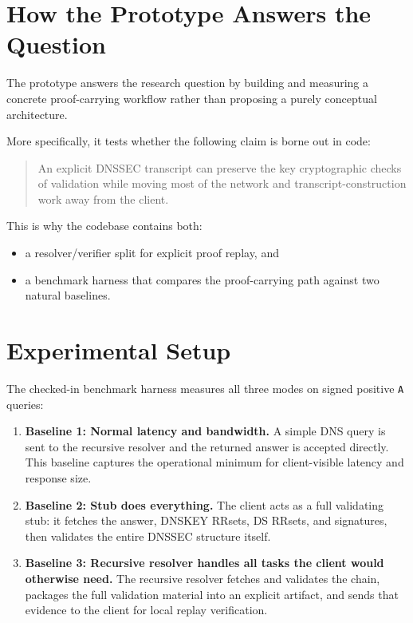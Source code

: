 \documentclass[11pt]{article}
\begin{document}
\section{How the Prototype Answers the Question}

The prototype answers the research question by building and measuring a concrete proof-carrying workflow rather than proposing a purely conceptual architecture.

More specifically, it tests whether the following claim is borne out in code:

\begin{quote}
An explicit DNSSEC transcript can preserve the key cryptographic checks of validation while moving most of the network and transcript-construction work away from the client.
\end{quote}

This is why the codebase contains both:

\begin{itemize}[nosep]
    \item a resolver/verifier split for explicit proof replay, and
    \item a benchmark harness that compares the proof-carrying path against two natural baselines.
\end{itemize}

\section{Experimental Setup}

The checked-in benchmark harness measures all three modes on signed positive \texttt{A} queries:

\begin{enumerate}[nosep]
    \item \textbf{Baseline 1: Normal latency and bandwidth.} A simple DNS query is sent to the recursive resolver and the returned answer is accepted directly. This baseline captures the operational minimum for client-visible latency and response size.
    \item \textbf{Baseline 2: Stub does everything.} The client acts as a full validating stub: it fetches the answer, DNSKEY RRsets, DS RRsets, and signatures, then validates the entire DNSSEC structure itself.
    \item \textbf{Baseline 3: Recursive resolver handles all tasks the client would otherwise need.} The recursive resolver fetches and validates the chain, packages the full validation material into an explicit artifact, and sends that evidence to the client for local replay verification.
\end{enumerate}
\end{document}
